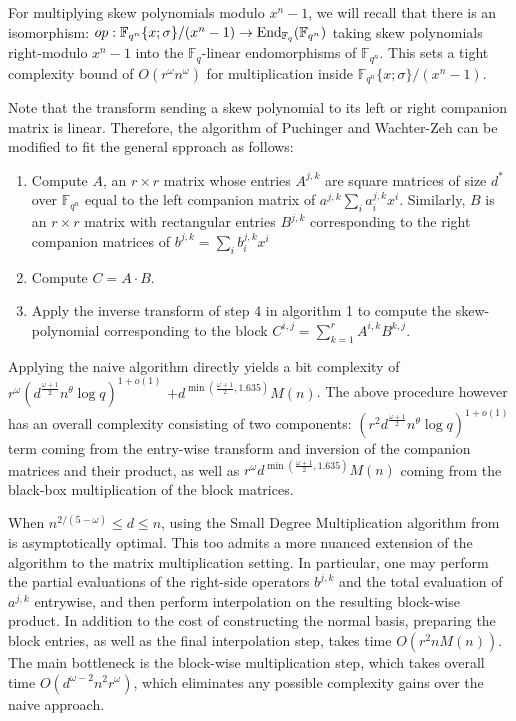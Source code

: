 \documentclass[9pt]{article}
\theoremstyle{plain}
\theoremstyle{definition}
\theoremstyle{remark}
\newcommand{\F}{\mathbb{F}}
\newcommand{\sring}{\F_{q^n}\{x; \sigma\}}
\newcommand{\enom}{\textnormal{End}}
\begin{document}
For multiplying skew polynomials modulo $x^n - 1$, we will recall that there is an isomorphism: $op: \sring / (x^n - 1) \to \enom_{\F_q}(\F_{q^n})$ taking skew polynomials right-modulo $x^n - 1$ into the $\F_q$-linear endomorphisms of $\F_{q^n}$. This sets a tight complexity bound of $O(r^{\omega}n^{\omega})$ for multiplication inside $\sring/(x^n - 1)$.

Note that the transform sending a skew polynomial to its left or right companion matrix is linear. Therefore, the algorithm of Puchinger and Wachter-Zeh can be modified to fit the general spproach as follows:

\begin{enumerate}
    \item Compute $A$, an $r \times r$ matrix whose entries $A^{j,k}$ are square matrices of size $d^{*}$ over $\F_{q^n}$ equal to the left companion matrix of $a^{j,k} \sum_{i}a_{i}^{j,k}x^{i}$. Similarly, $B$ is an $r \times r$ matrix with rectangular entries $B^{j,k}$ corresponding to the right companion matrices of $b^{j,k} = \sum_{i}b_{i}^{j,k}x^{i}$
    
    \item Compute $C = A \cdot B$.
    \item Apply the inverse transform of step 4 in algorithm 1 to compute the skew-polynomial corresponding to the block $C^{i,j} = \sum_{k = 1 }^{r} A^{i,k}B^{k,j}$.
    
\end{enumerate}

Applying the naive algorithm directly yields a bit complexity of $r^{\omega}(d^{\frac{\omega + 1}{2}} n^{\theta} \log q)^{1 + o(1)}$ $+ d^{\min(\frac{\omega + 1}{2}, 1.635)} M(n)$. The above procedure however has an overall complexity consisting of two components: $(r^2 d^{\frac{\omega + 1}{2}} n^{\theta} \log q)^{1+o(1)}$ term coming from the entry-wise transform and inversion of the companion matrices and their product, as well as $r^{\omega}d^{\min(\frac{\omega + 1}{2}, 1.635)} M(n)$ coming from the black-box multiplication of the block matrices.

When $n^{2/(5-\omega)} \leq d \leq n$, using the Small Degree Multiplication algorithm from \cite{CaLe17, Algorithm 5} is asymptotically optimal. This too admits a more nuanced extension of the algorithm to the matrix multiplication setting. In particular, one may perform the partial evaluations of the right-side operators $b^{j,k}$ and the total evaluation of $a^{j,k}$ entrywise, and then perform interpolation on the resulting block-wise product. In addition to the cost of constructing the normal basis, preparing the block entries, as well as the final interpolation step, takes time $O(r^2nM(n))$. The main bottleneck is the block-wise multiplication step, which takes overall time $O(d^{\omega -2}n^{2}r^{\omega})$, which eliminates any possible complexity gains over the naive approach.










\nocite{*}
\printbibliography
\end{document}
